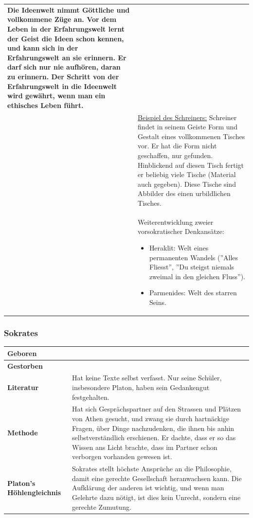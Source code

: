 \begin{longtable}{>{\bfseries}p{}p{}}
					Die Ideenwelt nimmt Göttliche und vollkommene Züge an. Vor dem Leben in der Erfahrungswelt lernt der Geist die Ideen schon kennen, und kann sich in der Erfahrungswelt an sie erinnern. Er darf sich nur nie aufhören, daran zu erinnern. Der Schritt von der Erfahrungswelt in die Ideenwelt wird gewährt, wenn man ein ethisches Leben führt.\\
				& \underline{Beispiel des Schreiners:}\newline
					Schreiner findet in seinem Geiste Form und Gestalt eines vollkommenen Tisches vor.\newline
					Er hat die Form nicht geschaffen, nur gefunden.\newline
					Hinblickend auf diesen Tisch fertigt er beliebig viele Tische (Material auch gegeben).\newline
					Diese Tische sind Abbilder des einen urbildlichen Tisches.\\
				& Weiterentwicklung zweier vorsokratischer Denkansätze:
					\begin{itemize}
					  \item Heraklit: Welt eines permanenten Wandels (''Alles Fliesst'', ''Du steigst niemals zweimal in den gleichen Fluss'').
					  \item Parmenides: Welt des starren Seins.
					\end{itemize}\\
				\hline														 
			\end{longtable}
			
			
		\subsubsection{Sokrates}
			\begin{longtable}{>{\bfseries}p{}p{}}
				\hline
				Geboren
					& \\
				\hline
				Gestorben
					& \\
				\hline
				Literatur
					& Hat keine Texte selbst verfasst.\newline
						Nur seine Schüler, insbesondere Platon, haben sein Gedankengut festgehalten.\\
				\hline
				Methode
					& Hat sich Gesprächspartner auf den Strassen und Plätzen von Athen gesucht, und zwang sie durch hartnäckige Fragen, über Dinge nachzudenken, die ihnen bis anhin selbstverständlich erschienen.\newline
						Er dachte, dass er so das Wissen ans Licht brachte, dass im Partner schon verborgen vorhanden gewesen ist.\\
				\hline
				Platon's Höhlengleichnis
					& Sokrates stellt höchste Ansprüche an die Philosophie, damit eine gerechte Gesellschaft heranwachsen kann. Die Aufklärung der anderen ist wichtig, und wenn man Gelehrte dazu nötigt, ist dies kein Unrecht, sondern eine gerechte Zumutung.\\
				\hline
			\end{longtable}	
			
